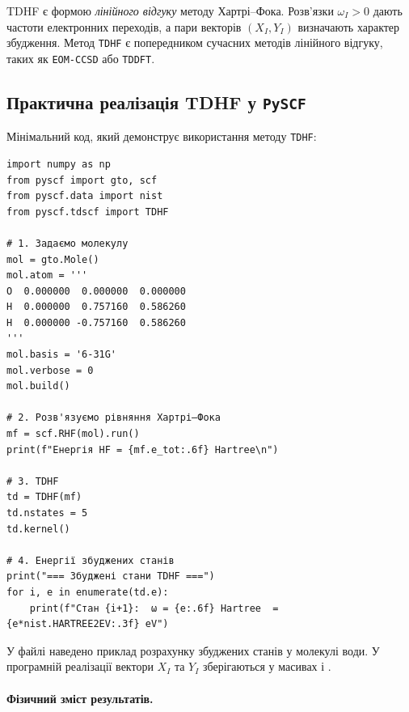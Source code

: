 TDHF є формою \emph{лінійного відгуку} методу Хартрі–Фока.
Розв’язки \(\omega_I > 0\) дають частоти електронних переходів,
а пари векторів \((X_I, Y_I)\) визначають характер збудження.
Метод \texttt{TDHF} є попередником сучасних методів лінійного відгуку,
таких як \texttt{EOM-CCSD} або \texttt{TDDFT}.



\subsection{Практична реалізація TDHF у \texttt{PySCF}}


Мінімальний код, який демонструє використання методу \texttt{TDHF}:
\begin{verbatim}
import numpy as np
from pyscf import gto, scf
from pyscf.data import nist
from pyscf.tdscf import TDHF

# 1. Задаємо молекулу
mol = gto.Mole()
mol.atom = '''
O  0.000000  0.000000  0.000000
H  0.000000  0.757160  0.586260
H  0.000000 -0.757160  0.586260
'''
mol.basis = '6-31G'
mol.verbose = 0
mol.build()

# 2. Розв'язуємо рівняння Хартрі–Фока
mf = scf.RHF(mol).run()
print(f"Енергія HF = {mf.e_tot:.6f} Hartree\n")

# 3. TDHF
td = TDHF(mf)
td.nstates = 5
td.kernel()

# 4. Енергії збуджених станів
print("=== Збуджені стани TDHF ===")
for i, e in enumerate(td.e):
    print(f"Стан {i+1}:  ω = {e:.6f} Hartree  = {e*nist.HARTREE2EV:.3f} eV")
\end{verbatim}

У файлі  наведено приклад розрахунку збуджених станів у молекулі води. У програмній реалізації вектори $X_I$ та $Y_I$  зберігаються у масивах  і .

\paragraph{Фізичний зміст результатів.}

